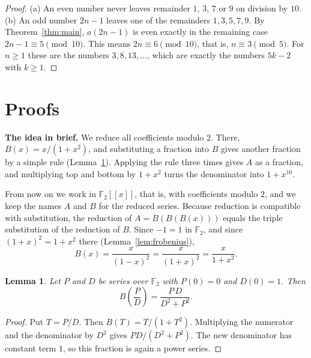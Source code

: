 \documentclass[11pt,a4paper]{article}
\newtheorem{lemma}[theorem]{Lemma}
\theoremstyle{definition}
\theoremstyle{remark}
\newcommand{\F}{\mathbb{F}}
\newcommand{\ps}[1]{#1[[x]]}
\newcommand{\para}[1]{\par\medskip\noindent\textbf{#1}\enspace}
\begin{document}
\begin{proof}
(a) An even number never leaves remainder $1$, $3$, $7$ or $9$ on division by $10$.
(b) An odd number $2n-1$ leaves one of the remainders $1,3,5,7,9$. By Theorem~\ref{thm:main}, $a(2n-1)$ is even
exactly in the remaining case $2n-1\equiv5\pmod{10}$. This means $2n\equiv6\pmod{10}$, that is, $n\equiv3\pmod5$. For
$n\ge1$ these are the numbers $3,8,13,\dots$, which are exactly the numbers $5k-2$ with $k\ge1$.
\end{proof}

\section{Proofs}\label{sec:proofs}

\para{The idea in brief.} We reduce all coefficients modulo $2$. There, $B(x)=x/(1+x^2)$, and substituting a fraction
into $B$ gives another fraction by a simple rule (Lemma~\ref{lem:step}). Applying the rule three times gives $A$ as a
fraction, and multiplying top and bottom by $1+x^2$ turns the denominator into $1+x^{10}$.

From now on we work in $\ps{\F_2}$, that is, with coefficients modulo $2$, and we keep the names $A$ and $B$ for the
reduced series. Because reduction is compatible with substitution, the reduction of $A=B(B(B(x)))$ equals the triple
substitution of the reduction of $B$. Since $-1=1$ in $\F_2$, and since $(1+x)^2=1+x^2$ there (Lemma~\ref{lem:frobenius}),
\[
B(x)=\frac{x}{(1-x)^2}=\frac{x}{(1+x)^2}=\frac{x}{1+x^2}.
\]

\begin{lemma}\label{lem:step}
Let $P$ and $D$ be series over $\F_2$ with $P(0)=0$ and $D(0)=1$. Then
\[
B\!\left(\frac PD\right)=\frac{P\,D}{D^2+P^2}.
\]
\end{lemma}

\begin{proof}
Put $T=P/D$. Then $B(T)=T/(1+T^2)$. Multiplying the numerator and the denominator by $D^2$ gives
$PD/(D^2+P^2)$. The new denominator has constant term $1$, so this fraction is again a power series.
\end{proof}
\end{document}
